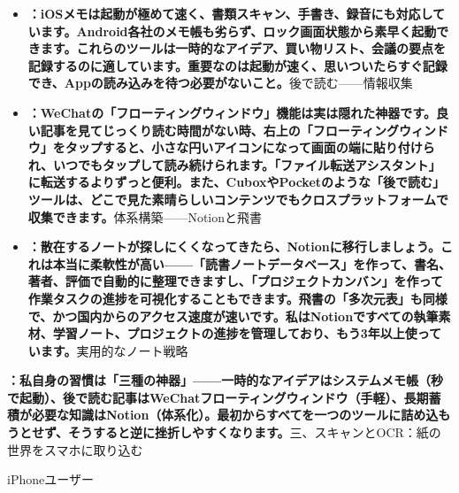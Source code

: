 \begin{itemize}
  \item \textbf{：iOSメモは起動が極めて速く、書類スキャン、手書き、録音にも対応しています。Android各社のメモ帳も劣らず、ロック画面状態から素早く起動できます。これらのツールは一時的なアイデア、買い物リスト、会議の要点を記録するのに適しています。重要なのは起動が速く、思いついたらすぐ記録でき、Appの読み込みを待つ必要がないこと。}後で読む——情報収集
  \item \textbf{：WeChatの「フローティングウィンドウ」機能は実は隠れた神器です。良い記事を見てじっくり読む時間がない時、右上の「フローティングウィンドウ」をタップすると、小さな円いアイコンになって画面の端に貼り付けられ、いつでもタップして読み続けられます。「ファイル転送アシスタント」に転送するよりずっと便利。また、CuboxやPocketのような「後で読む」ツールは、どこで見た素晴らしいコンテンツでもクロスプラットフォームで収集できます。}体系構築——Notionと飛書
  \item \textbf{：散在するノートが探しにくくなってきたら、Notionに移行しましょう。これは本当に柔軟性が高い——「読書ノートデータベース」を作って、書名、著者、評価で自動的に整理できますし、「プロジェクトカンバン」を作って作業タスクの進捗を可視化することもできます。飛書の「多次元表」も同様で、かつ国内からのアクセス速度が速いです。私はNotionですべての執筆素材、学習ノート、プロジェクトの進捗を管理しており、もう3年以上使っています。}実用的なノート戦略
\end{itemize}

\textbf{：私自身の習慣は「三種の神器」——一時的なアイデアはシステムメモ帳（秒で起動）、後で読む記事はWeChatフローティングウィンドウ（手軽）、長期蓄積が必要な知識はNotion（体系化）。最初からすべてを一つのツールに詰め込もうとせず、そうすると逆に挫折しやすくなります。}三、スキャンとOCR：紙の世界をスマホに取り込む


iPhoneユーザー

